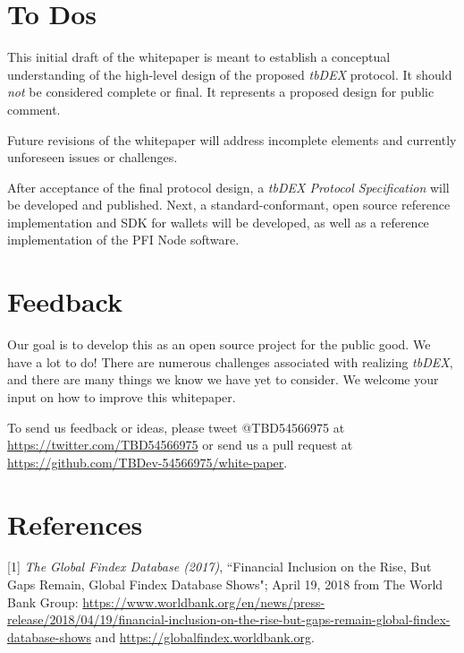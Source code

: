 \documentclass[11pt]{article}
\begin{document}
\section{To Dos}

\vspace{1\baselineskip}
This initial draft of the whitepaper is meant to establish a conceptual understanding of the high-level design of the proposed \textit{tbDEX} protocol. It should \textit{not} be considered complete or final. It represents a proposed design for public comment.  

\vspace{1\baselineskip}
Future revisions of the whitepaper will address incomplete elements and currently unforeseen issues or challenges. 

\vspace{1\baselineskip}
After acceptance of the final protocol design, a \textit{tbDEX Protocol Specification }will be developed and published. Next, a standard-conformant, open source reference implementation and SDK for wallets will be developed, as well as a reference implementation of the PFI Node software. 

\vspace{1\baselineskip}
\section{Feedback}

\vspace{1\baselineskip}
Our goal is to develop this as an open source project for the public good. We have a lot to do! There are numerous challenges associated with realizing \textit{tbDEX}, and there are many things we know we have yet to consider. We welcome your input on how to improve this whitepaper. 

\vspace{1\baselineskip}
To send us feedback or ideas, please tweet @TBD54566975 at \url{https://twitter.com/TBD54566975} or send us a pull request at \url{https://github.com/TBDev-54566975/white-paper}{\Large .}

\vspace{1\baselineskip}
\section{References}

[1] \textit{The Global Findex Database (2017)}, ``Financial Inclusion on the Rise, But Gaps Remain, Global Findex Database Shows"; April 19, 2018 from The World Bank Group: \url{https://www.worldbank.org/en/news/press-release/2018/04/19/financial-inclusion-on-the-rise-but-gaps-remain-global-findex-database-shows} and \url{https://globalfindex.worldbank.org}. 
\end{document}

